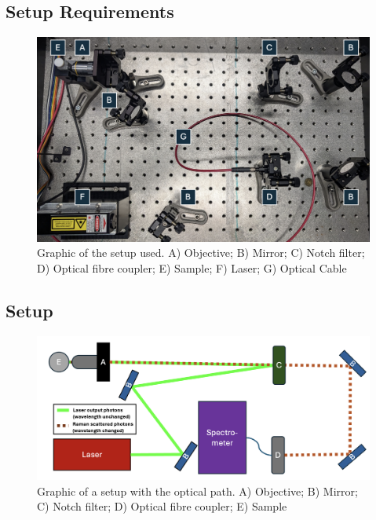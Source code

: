 \subsection{Setup Requirements}

\begin{figure}[ht]
    \centering
    \includegraphics[width=\textwidth]{images/setup_graphics/setup_photo_numbered.png}
    \caption{Graphic of the setup used. A) Objective; B) Mirror; C) Notch filter; D) Optical fibre coupler; E) Sample; F) Laser; G) Optical Cable}
    \label{fig:setup_photo_numbered}
\end{figure}


\subsection{Setup}

\begin{figure}[ht]
    \centering
    \includegraphics[width=\textwidth]{images/setup_graphics/setup_graphic.png}
    \caption{Graphic of a setup with the optical path. A) Objective; B) Mirror; C) Notch filter; D) Optical fibre coupler; E) Sample}
    \label{fig:setup_graphic}
\end{figure}

